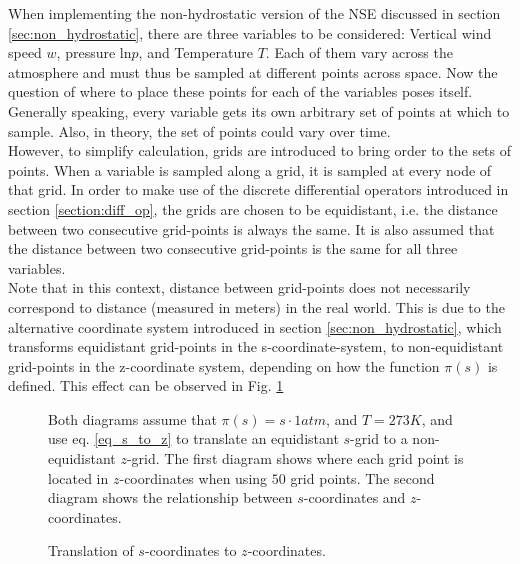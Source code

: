 When implementing the non-hydrostatic version of the NSE discussed in section \ref{sec:non_hydrostatic}, there are three variables to be considered: Vertical wind speed $w$, pressure $\text{ln}p$, and Temperature $T$.
Each of them vary across the atmosphere and must thus be sampled at different points across space.
Now the question of where to place these points for each of the variables poses itself.\\
Generally speaking, every variable gets its own arbitrary set of points at which to sample.
Also, in theory, the set of points could vary over time.\\
However, to simplify calculation, grids are introduced to bring order to the sets of points.
When a variable is sampled along a grid, it is sampled at every node of that grid.
In order to make use of the discrete differential operators introduced in section \ref{section:diff_op}, the grids are chosen to be equidistant, i.e. the distance between two consecutive grid-points is always the same.
It is also assumed that the distance between two consecutive grid-points is the same for all three variables.\\
Note that in this context, distance between grid-points does not necessarily correspond to distance (measured in meters) in the real world.
This is due to the alternative coordinate system introduced in section \ref{sec:non_hydrostatic}, which transforms equidistant grid-points in the s-coordinate-system, to non-equidistant grid-points in the z-coordinate system, depending on how the function $\pi(s)$ is defined.
This effect can be observed in Fig. \ref{fig:s_grid}
\begin{figure}[ht]
    \caption{Translation of $s$-coordinates to $z$-coordinates.}
    \label{fig:s_grid}
    \small
    Both diagrams assume that $\pi (s)=s\cdot 1atm$, and $T=273K$, and use eq. \ref{eq_s_to_z} to translate an equidistant $s$-grid to a non-equidistant $z$-grid.
    The first diagram shows where each grid point is located in $z$-coordinates when using $50$ grid points. 
    The second diagram shows the relationship between $s$-coordinates and $z$-coordinates.
\end{figure}
